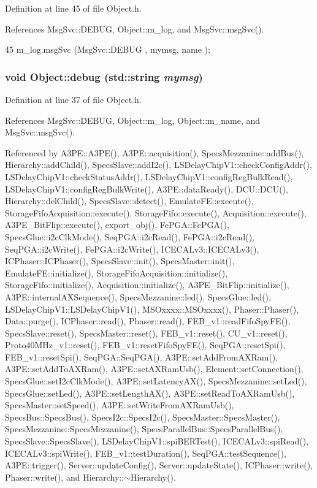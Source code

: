 Definition at line 45 of file Object.h.

References MsgSvc::DEBUG, Object::m\_\-log, and MsgSvc::msgSvc().


\begin{DoxyCode}
45 { m_log.msgSvc (MsgSvc::DEBUG   , mymsg, name ); }
\end{DoxyCode}
\hypertarget{classObject_aac010553f022165573714b7014a15f0d}{
\subsubsection[{debug}]{\setlength{\rightskip}{0pt plus 5cm}void Object::debug (std::string {\em mymsg})}}
\label{classObject_aac010553f022165573714b7014a15f0d}


Definition at line 37 of file Object.h.

References MsgSvc::DEBUG, Object::m\_\-log, Object::m\_\-name, and MsgSvc::msgSvc().

Referenced by A3PE::A3PE(), A3PE::acquisition(), SpecsMezzanine::addBus(), Hierarchy::addChild(), SpecsSlave::addI2c(), LSDelayChipV1::checkConfigAddr(), LSDelayChipV1::checkStatusAddr(), LSDelayChipV1::configRegBulkRead(), LSDelayChipV1::configRegBulkWrite(), A3PE::dataReady(), DCU::DCU(), Hierarchy::delChild(), SpecsSlave::detect(), EmulateFE::execute(), StorageFifoAcquisition::execute(), StorageFifo::execute(), Acquisition::execute(), A3PE\_\-BitFlip::execute(), export\_\-obj(), FePGA::FePGA(), SpecsGlue::i2cClkMode(), SeqPGA::i2cRead(), FePGA::i2cRead(), SeqPGA::i2cWrite(), FePGA::i2cWrite(), ICECALv3::ICECALv3(), ICPhaser::ICPhaser(), SpecsSlave::init(), SpecsMaster::init(), EmulateFE::initialize(), StorageFifoAcquisition::initialize(), StorageFifo::initialize(), Acquisition::initialize(), A3PE\_\-BitFlip::initialize(), A3PE::internalAXSequence(), SpecsMezzanine::led(), SpecsGlue::led(), LSDelayChipV1::LSDelayChipV1(), MSOxxxx::MSOxxxx(), Phaser::Phaser(), Data::purge(), ICPhaser::read(), Phaser::read(), FEB\_\-v1::readFifoSpyFE(), SpecsSlave::reset(), SpecsMaster::reset(), FEB\_\-v1::reset(), CU\_\-v1::reset(), Proto40MHz\_\-v1::reset(), FEB\_\-v1::resetFifoSpyFE(), SeqPGA::resetSpi(), FEB\_\-v1::resetSpi(), SeqPGA::SeqPGA(), A3PE::setAddFromAXRam(), A3PE::setAddToAXRam(), A3PE::setAXRamUsb(), Element::setConnection(), SpecsGlue::setI2cClkMode(), A3PE::setLatencyAX(), SpecsMezzanine::setLed(), SpecsGlue::setLed(), A3PE::setLengthAX(), A3PE::setReadToAXRamUsb(), SpecsMaster::setSpeed(), A3PE::setWriteFromAXRamUsb(), SpecsBus::SpecsBus(), SpecsI2c::SpecsI2c(), SpecsMaster::SpecsMaster(), SpecsMezzanine::SpecsMezzanine(), SpecsParallelBus::SpecsParallelBus(), SpecsSlave::SpecsSlave(), LSDelayChipV1::spiBERTest(), ICECALv3::spiRead(), ICECALv3::spiWrite(), FEB\_\-v1::testDuration(), SeqPGA::testSequence(), A3PE::trigger(), Server::updateConfig(), Server::updateState(), ICPhaser::write(), Phaser::write(), and Hierarchy::$\sim$Hierarchy().


